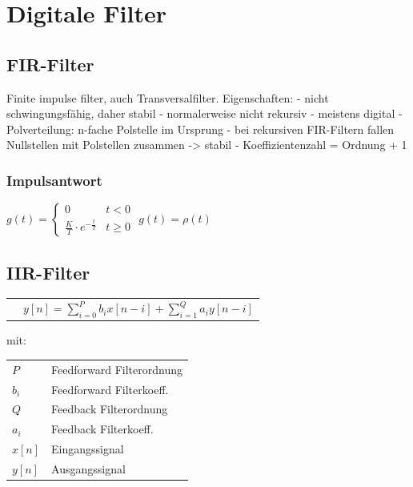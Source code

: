 \section{Digitale Filter}

\subsection{FIR-Filter}
Finite impulse filter, auch Transversalfilter.
Eigenschaften:
- nicht schwingungsfähig, daher stabil
- normalerweise nicht rekursiv
- meistens digital
- Polverteilung: n-fache Polstelle im Ursprung
- bei rekursiven FIR-Filtern fallen Nullstellen mit Polstellen zusammen -> stabil
- Koeffizientenzahl = Ordnung + 1

	\subsubsection{Impulsantwort}

	$g(t) = \begin{cases}
		0 & t < 0 \\
		\frac{K}{T}\cdot e^{-\frac{t}{T}} & t \ge 0
	\end{cases}$
	$g(t) = \rho(t)$
	

\subsection{IIR-Filter}

	\begin{emphbox}	
	\begin{tabular}{ll}
		
		& $ y[n] = \sum\limits_{i=0}^{P} b_i x[n-i] + \sum\limits_{i=1}^{Q} a_i y[n-i]$
		
	\end{tabular}
\end{emphbox}

mit:

	\begin{symbolbox}
		\begin{tabular}{ll}
			$ P $    & Feedforward Filterordnung \\
			$ b_i $  & Feedforward Filterkoeff. \\
			$ Q $    & Feedback Filterordnung \\
			$ a_i $  & Feedback Filterkoeff. \\
			$ x[n] $ & Eingangssignal \\
			$ y[n] $ & Ausgangssignal
		\end{tabular}
	\end{symbolbox}

